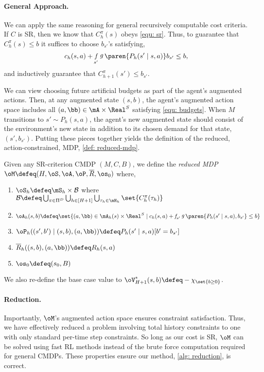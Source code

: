 \documentclass[pdftex, a4paper, 12pt]{article}
\newcommand{\mB}{\mathcal{B}}
\newcommand{\oR}{\overline{R}}
\DeclareMathOperator*{\f}{\mathit{f}}
\DeclareMathOperator*{\g}{\mathit{g}}
\begin{document}
\paragraph{General Approach.} We can apply the same reasoning for general recursively computable cost criteria. If $C$ is SR, then we know that $C_h^{\pi}(s)$ obeys \eqref{equ: sr}. Thus, to guarantee that $C_h^{\pi}(s) \leq b$ it suffices to choose $b_{s'}$'s satisfying,
\begin{equation}
    c_h(s,a) + \f_{s'}\g\paren{P_h(s' \mid s,a)} b_{s'} \leq b,
\end{equation}
and inductively guarantee that $C_{h+1}^{\pi}(s') \leq b_{s'}$.

We can view choosing future artificial budgets as part of the agent's augmented actions. Then, at any augmented state $(s,b)$, the agent's augmented action space includes all $(a,\bb) \in \mA \times \Real^{S}$ satisfying \eqref{equ: budgets}. When $M$ transitions to $s' \sim P_h(s, a)$, the agent's new augmented state should consist of the environment's new state in addition to its chosen demand for that state, $(s', b_{s'})$. Putting these pieces together yields the definition of the reduced, action-constrained, MDP, \cref{def: reduced-mdp}. 

\begin{definition}\label{def: reduced-mdp}
    Given any SR-criterion CMDP $(M, C, B)$, we define
    the \emph{reduced MDP} $\oM \defeq (H, \oS, \oA, \oP, \oR, \os_0)$ where,
    \begin{enumerate}
        \item $\oS_h \defeq \mS_h \times \mB$ where $\mB \defeq \bigcup_{\pi \in \Pi^D} \bigcup_{h \in [H+1]} \bigcup_{\tau_h \in \mH_h} \set{C_h^{\pi}(\tau_h)}$
        \item $\oA_h(s, b) \defeq \set{(a,\bb) \in \mA_h(s) \times \Real^{S} \mid c_h(s,a) + \f_{s'} \g\paren{P_h(s' \mid s,a), b_{s'}} \leq b}$
        \item $\oP_h((s', b') \mid (s,b), (a, \bb)) \defeq P_h(s' \mid s,a)[b' = b_{s'}]$
        \item $\oR_h((s,b), (a,\bb)) \defeq R_h(s,a)$
        \item $\os_0 \defeq (s_0, B)$
    \end{enumerate}
    We also re-define the base case value to $\oV^*_{H+1}(s,b) \defeq -\chi_{\set{b \geq 0}}$.
\end{definition}

\paragraph{Reduction.} Importantly, $\oM$'s augmented action space ensures constraint satisfaction. Thus, we have effectively reduced a problem involving total history constraints to one with only standard per-time step constraints.
So long as our cost is SR, $\oM$ can be solved using fast RL methods instead of the brute force computation required for general CMDPs. These properties ensure our method, \cref{alg: reduction}, is correct.
\end{document}
